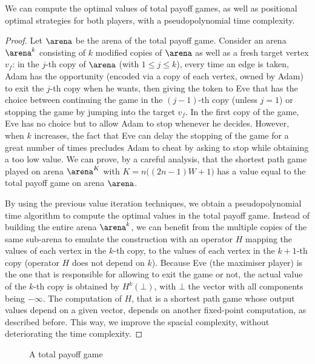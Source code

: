 \begin{theorem}\label{4-thm:TP-optimal-strategies}
  We can compute the optimal values of total payoff games, as well as
  positional optimal strategies for both players, with a
  pseudopolynomial time complexity.
\end{theorem}
\begin{proof}%
  Let $\arena$ be the arena of the total payoff game. Consider an
  arena $\arena^k$ consisting of $k$ modified copies of $\arena$ as
  well as a fresh target vertex $v_f$: in the $j$-th copy of $\arena$
  (with $1\leq j\leq k$), every time an edge is taken, Adam has the
  opportunity (encoded via a copy of each vertex, owned by Adam) to
  exit the $j$-th copy when he wants, then giving the token to Eve
  that has the choice between continuing the game in the $(j-1)$-th
  copy (unless $j=1$) or stopping the game by jumping into the target
  $v_f$. In the first copy of the game, Eve has no choice but to allow
  Adam to stop whenever he decides. However, when $k$ increases, the
  fact that Eve can delay the stopping of the game for a great number
  of times precludes Adam to cheat by asking to stop while obtaining a
  too low value. We can prove, by a careful analysis, that the
  shortest path game played on arena $\arena^K$ with
  $K= n\big((2n-1)W +1\big)$ has a value equal to the
  total payoff game on arena $\arena$.

  By using the previous value iteration techniques, we obtain a
  pseudopolynomial time algorithm to compute the optimal values in
  the total payoff game. Instead of building the entire arena
  $\arena^k$, we can benefit from the multiple copies of the same
  sub-arena to emulate the construction with an operator $H$ mapping
  the values of each vertex in the $k$-th copy, to the values of each
  vertex in the $k+1$-th copy (operator $H$ does not depend on
  $k$). Because Eve (the maximiser player) is the one that is
  responsible for allowing to exit the game or not, the actual value
  of the $k$-th copy is obtained by $H^k(\bot)$, with $\bot$ the
  vector with all components being $-\infty$. The computation of $H$,
  that is a shortest path game whose output values depend on a given
  vector, depends on another fixed-point computation, as described
  before. This way, we improve the spacial complexity, without
  deteriorating the time complexity.
\end{proof}



\begin{figure}[tbp]
  \centering

  \caption{A total payoff game}
  \label{4-fig:totalpayoff}
\end{figure}


